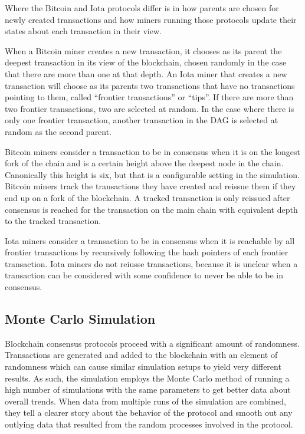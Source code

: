 \documentclass[letterpaper,11pt]{article}
\begin{document}
Where the Bitcoin and Iota protocols differ is in how parents are chosen for newly created transactions and how miners running those protocols update their states about each transaction in their view.

When a Bitcoin miner creates a new transaction, it chooses as its parent the deepest transaction in its view of the blockchain, chosen randomly in the case that there are more than one at that depth. An Iota miner that creates a new transaction will choose as its parents two transactions that have no transactions pointing to them, called ``frontier transactions'' or ``tips''. If there are more than two frontier transactions, two are selected at random. In the case where there is only one frontier transaction, another transaction in the DAG is selected at random as the second parent.

Bitcoin miners consider a transaction to be in consensus when it is on the longest fork of the chain and is a certain height above the deepest node in the chain. Canonically this height is six, but that is a configurable setting in the simulation. Bitcoin miners track the transactions they have created and reissue them if they end up on a fork of the blockchain. A tracked transaction is only reissued after consensus is reached for the transaction on the main chain with equivalent depth to the tracked transaction.

Iota miners consider a transaction to be in consensus when it is reachable by all frontier transactions by recursively following the hash pointers of each frontier transaction. Iota miners do not reiusse transactions, because it is unclear when a transaction can be considered with some confidence to never be able to be in consensus.

\subsection{Monte Carlo Simulation}
Blockchain consensus protocols proceed with a significant amount of randomness. Transactions are generated and added to the blockchain with an element of randomness which can cause similar simulation setups to yield very different results. As such, the simulation employs the Monte Carlo method of running a high number of simulations with the same parameters to get better data about overall trends. When data from multiple runs of the simulation are combined, they tell a clearer story about the behavior of the protocol and smooth out any outlying data that resulted from the random processes involved in the protocol.
\end{document}
